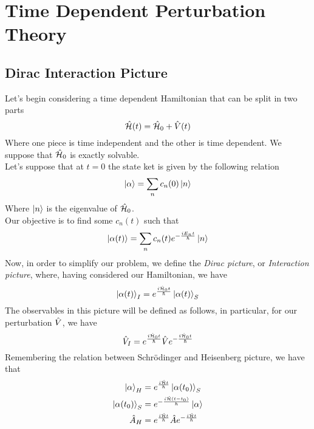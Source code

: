 \documentclass[../qm.tex]{subfiles}
\begin{document}
	\section{Time Dependent Perturbation Theory}
	\subsection{Dirac Interaction Picture}
	Let's begin considering a time dependent Hamiltonian that can be split in two parts
	\begin{equation}
		\hat{\mathcal{H}}(t)=\hat{\mathcal{H}}_0+\hat{V}(t)
		\label{eq:timedephampert}
	\end{equation}
	Where one piece is time independent and the other is time dependent. We suppose that $\hat{\mathcal{H}}_0$ is exactly solvable.\\
	Let's suppose that at $t=0$ the state ket is given by the following relation
	\begin{equation}
		\ket{\alpha}=\sum_nc_n(0)\ket{n}
		\label{eq:statekettimedeppert}
	\end{equation}
	Where $\ket{n}$ is the eigenvalue of $\hat{\mathcal{H}}_0$.\\
	Our objective is to find some $c_n(t)$ such that
	\begin{equation}
		\ket{\alpha(t)}=\sum_nc_n(t)e^{-\frac{iE_nt}{\hbar}}\ket{n}
		\label{eq:findthiskettdpt}
	\end{equation}
	Now, in order to simplify our problem, we define the \textit{Dirac picture}, or \textit{Interaction picture}, where, having considered our Hamiltonian, we have
	\begin{equation}
		\ket{\alpha(t)}_I=e^{\frac{i\hat{\mathcal{H}}_0t}{\hbar}}\ket{\alpha(t)}_S
		\label{eq:intpicturetdp}
	\end{equation}
	The observables in this picture will be defined as follows, in particular, for our perturbation $\hat{V}$, we have
	\begin{equation}
		\hat{V}_I=e^{\frac{i\hat{\mathcal{H}}_0t}{\hbar}}\hat{V}e^{-\frac{i\hat{\mathcal{H}}_0t}{\hbar}}
		\label{eq:Vintpictdpt}
	\end{equation}
	Remembering the relation between Schrödinger and Heisenberg picture, we have that
	\begin{equation}
		\begin{aligned}
			\ket{\alpha}_H&=e^{\frac{i\hat{\mathcal{H}} t}{\hbar}}\ket{\alpha(t_0)}_S\\
			\ket{\alpha(t_0)}_S&=e^{-\frac{i\hat{\mathcal{H}} (t-t_0)}{\hbar}}\ket{\alpha}\\
			\hat{A}_H&=e^{\frac{i\hat{\mathcal{H}} t}{\hbar}}\hat{A}e^{-\frac{i\hat{\mathcal{H}} t}{\hbar}}
		\end{aligned}
		\label{eq:schrtoheisrep}
	\end{equation}
\end{document}
